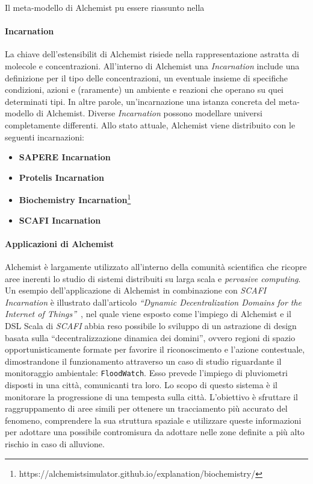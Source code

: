 Il meta-modello di Alchemist pu essere riassunto nella 


\paragraph{Incarnation}\label{}
La chiave dell'estensibilit di Alchemist risiede nella rappresentazione astratta di molecole e concentrazioni.
All'interno di Alchemist una \textit{Incarnation} include una definizione per il tipo delle concentrazioni, un eventuale insieme di specifiche
condizioni, azioni e (raramente) un ambiente e reazioni che operano su quei determinati tipi. In altre parole, un'incarnazione  una
istanza concreta del meta-modello di Alchemist.
%
Diverse \textit{Incarnation} possono modellare universi completamente differenti. Allo stato attuale, Alchemist viene distribuito con le seguenti incarnazioni:
\begin{itemize}
    \item \textbf{SAPERE Incarnation}~\cite{sapere}
    \item \textbf{Protelis Incarnation}~\cite{protelis}
    \item \textbf{Biochemistry Incarnation}\footnote{https://alchemistsimulator.github.io/explanation/biochemistry/}
    \item \textbf{SCAFI Incarnation}~\cite{CASADEI2022101248}
\end{itemize}

\paragraph{Applicazioni di Alchemist}
Alchemist è largamente utilizzato all'interno della comunità scientifica che ricopre aree inerenti lo studio di sistemi distribuiti su larga scala e \textit{pervasive computing}.
Un esempio dell'applicazione di Alchemist in combinazione con \textit{SCAFI Incarnation} è illustrato dall'articolo \textit{``Dynamic Decentralization Domains for the Internet of Things''}~\cite{ddd-iot},
nel quale viene esposto come l'impiego di Alchemist e il \ac{DSL} Scala di \textit{SCAFI} abbia reso possibile lo sviluppo di un astrazione di design
basata sulla ``decentralizzazione dinamica dei domini'', ovvero regioni di spazio opportunisticamente formate per favorire il riconoscimento e l'azione
contestuale, dimostrandone il funzionamento attraverso un caso di studio riguardante il monitoraggio ambientale: \texttt{FloodWatch}. Esso prevede
l'impiego di pluviometri disposti in una città, comunicanti tra loro. Lo scopo di questo sistema è il monitorare la progressione di una tempesta sulla città.
L'obiettivo è sfruttare il raggruppamento di aree simili per ottenere un tracciamento più accurato del fenomeno, comprendere la sua struttura spaziale e
utilizzare queste informazioni per adottare una possibile contromisura da adottare nelle zone definite a più alto rischio in caso di alluvione.

